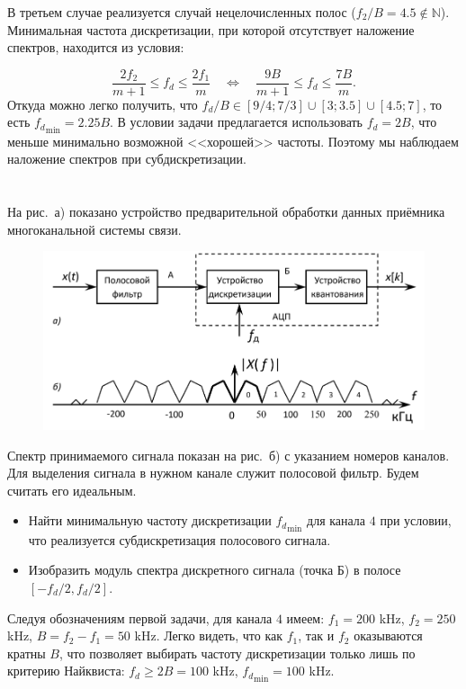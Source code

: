 В третьем случае реализуется случай нецелочисленных полос ($f_2/B = 4.5 \notin \mathbb{N}$). Минимальная частота дискретизации, при которой отсутствует наложение спектров, находится из условия:

\begin{equation*}
\dfrac{2f_2}{m+1} \leq f_d \leq \dfrac{2f_1}{m} \quad \Leftrightarrow \quad \dfrac{9B}{m+1} \leq f_d \leq \dfrac{7B}{m}.
\end{equation*}
Откуда можно легко получить, что $f_d/B \in \left[9/4; 7/3\right] \cup \left[3; 3.5\right] \cup [4.5; 7]$, то есть ${f_d}_{\min} = 2.25B$. 
В условии задачи предлагается использовать $f_d = 2B$, что меньше минимально возможной <<хорошей>> частоты. Поэтому мы наблюдаем наложение спектров при субдискретизации.


\section{}
На рис.~а) показано устройство предварительной обработки данных приёмника многоканальной системы связи.

\begin{figure}[h]
	\centering
	\includegraphics[width=0.8\linewidth]{pics/spring/11/11-2-0.png}
	\label{fig:11-2-0}
\end{figure}


Спектр принимаемого сигнала показан на рис.~б) с указанием номеров каналов. Для выделения сигнала в нужном канале служит полосовой фильтр. Будем считать его идеальным.

\begin{itemize}
	\item Найти минимальную частоту дискретизации ${f_d}_{\min}$ для канала $4$ при условии, что реализуется субдискретизация полосового сигнала.
	\item Изобразить модуль спектра дискретного сигнала (точка Б) в полосе $[-f_d/2, f_d/2]$.
\end{itemize}

Следуя обозначениям первой задачи, для канала $4$ имеем: $f_1 = 200$ kHz, $f_2 = 250$ kHz, $B = f_2 - f_1 = 50$ kHz. Легко видеть, что как $f_1$, так и $f_2$ оказываются кратны $B$, что позволяет выбирать частоту дискретизации только лишь по критерию Найквиста: $f_d \geq 2B = 100$ kHz, ${f_d}_{\min} = 100$ kHz.

